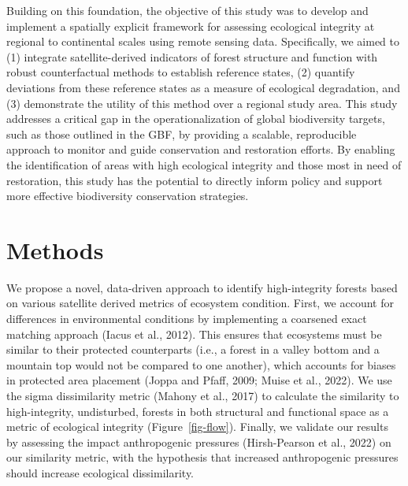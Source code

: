 \documentclass[
]{agujournal2019}
\begin{document}
Building on this foundation, the objective of this study was to develop
and implement a spatially explicit framework for assessing ecological
integrity at regional to continental scales using remote sensing data.
Specifically, we aimed to (1) integrate satellite-derived indicators of
forest structure and function with robust counterfactual methods to
establish reference states, (2) quantify deviations from these reference
states as a measure of ecological degradation, and (3) demonstrate the
utility of this method over a regional study area. This study addresses
a critical gap in the operationalization of global biodiversity targets,
such as those outlined in the GBF, by providing a scalable, reproducible
approach to monitor and guide conservation and restoration efforts. By
enabling the identification of areas with high ecological integrity and
those most in need of restoration, this study has the potential to
directly inform policy and support more effective biodiversity
conservation strategies.

\section{Methods}\label{methods}

We propose a novel, data-driven approach to identify high-integrity
forests based on various satellite derived metrics of ecosystem
condition. First, we account for differences in environmental conditions
by implementing a coarsened exact matching approach (Iacus et al.,
2012). This ensures that ecosystems must be similar to their protected
counterparts (i.e., a forest in a valley bottom and a mountain top would
not be compared to one another), which accounts for biases in protected
area placement (Joppa and Pfaff, 2009; Muise et al., 2022). We use the
sigma dissimilarity metric (Mahony et al., 2017) to calculate the
similarity to high-integrity, undisturbed, forests in both structural
and functional space as a metric of ecological integrity
(Figure~\ref{fig-flow}). Finally, we validate our results by assessing
the impact anthropogenic pressures (Hirsh-Pearson et al., 2022) on our
similarity metric, with the hypothesis that increased anthropogenic
pressures should increase ecological dissimilarity.
\end{document}
